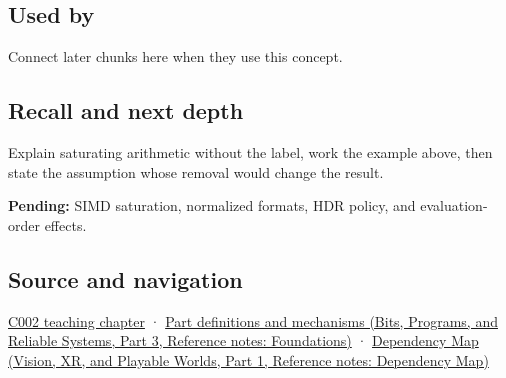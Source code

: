 \subsection{Used by}\label{appendix-3999c6209649-used-by}

\hypertarget{appendix-3999c6209649-used-by}{}

Connect later chunks here when they use this concept.

\subsection{Recall and next depth}\label{appendix-3999c6209649-recall-and-next-depth}

\hypertarget{appendix-3999c6209649-recall-and-next-depth}{}

Explain saturating arithmetic without the label, work the example above, then state the assumption whose removal would change the result.

\textbf{Pending:} SIMD saturation, normalized formats, HDR policy, and evaluation-order effects.

\subsection{Source and navigation}\label{appendix-3999c6209649-source-and-navigation}

\hypertarget{appendix-3999c6209649-source-and-navigation}{}

\hyperref[01-foundations-i-ch001-arithmetic-becomes-a-policy]{C002 teaching chapter} · \href{../01-Bits-Programs-and-Reliable-Systems-P03/main.pdf\#nameddest=appendix-fd090d982a15}{Part definitions and mechanisms (Bits, Programs, and Reliable Systems, Part 3, Reference notes: Foundations)} · \href{../07-Vision-XR-and-Playable-Worlds-P01/main.pdf\#nameddest=appendix-4ad47bdd269a}{Dependency Map (Vision, XR, and Playable Worlds, Part 1, Reference notes: Dependency Map)}
